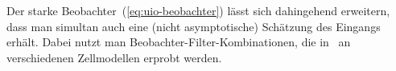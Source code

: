 \begin{remark}
Der starke Beobachter~(\ref{eq:uio-beobachter}) lässt sich dahingehend
erweitern, dass man simultan auch eine (nicht asymptotische) Schätzung
des Eingangs erhält. Dabei nutzt man Beobachter-Filter-Kombinationen,
die in~\cite{goel2005tech,roebenack2007medjmc,roebenack2009ijss,roebenack2009ndst}
an verschiedenen Zellmodellen erprobt werden.
\end{remark}




